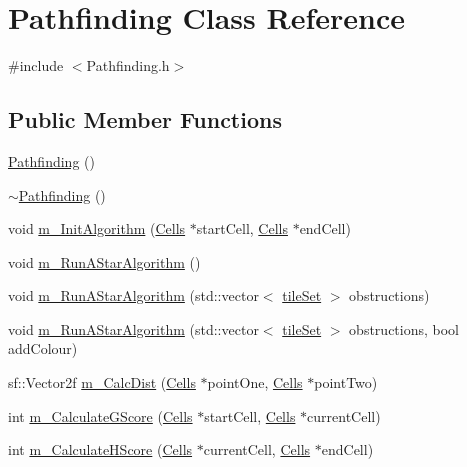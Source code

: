\hypertarget{class_pathfinding}{}\section{Pathfinding Class Reference}
\label{class_pathfinding}


{\ttfamily \#include $<$Pathfinding.\+h$>$}

\subsection*{Public Member Functions}
\begin{DoxyCompactItemize}
\item 
\mbox{\hyperlink{class_pathfinding_aae14d204c5f9ee6b184764f874711341}{Pathfinding}} ()
\item 
\mbox{\hyperlink{class_pathfinding_a1869823af12d301105cf1cedbe9a8dc5}{$\sim$\+Pathfinding}} ()
\item 
void \mbox{\hyperlink{class_pathfinding_a4c5a8788f066f2b91ab52958b211f28d}{m\+\_\+\+Init\+Algorithm}} (\mbox{\hyperlink{class_cells}{Cells}} $\ast$start\+Cell, \mbox{\hyperlink{class_cells}{Cells}} $\ast$end\+Cell)
\item 
void \mbox{\hyperlink{class_pathfinding_a423a7763b0990f4143ffcc517ddf2c29}{m\+\_\+\+Run\+A\+Star\+Algorithm}} ()
\item 
void \mbox{\hyperlink{class_pathfinding_a15896b383f998b1fd8e996b11abfa17a}{m\+\_\+\+Run\+A\+Star\+Algorithm}} (std\+::vector$<$ \mbox{\hyperlink{_cells_8h_adc5e4636eae42cdad2a070c6adbd9daf}{tile\+Set}} $>$ obstructions)
\item 
void \mbox{\hyperlink{class_pathfinding_a0dcc4744c8892ca16c6f685f8c534645}{m\+\_\+\+Run\+A\+Star\+Algorithm}} (std\+::vector$<$ \mbox{\hyperlink{_cells_8h_adc5e4636eae42cdad2a070c6adbd9daf}{tile\+Set}} $>$ obstructions, bool add\+Colour)
\item 
sf\+::\+Vector2f \mbox{\hyperlink{class_pathfinding_a17051c2f3466edb6299444e87d6033fc}{m\+\_\+\+Calc\+Dist}} (\mbox{\hyperlink{class_cells}{Cells}} $\ast$point\+One, \mbox{\hyperlink{class_cells}{Cells}} $\ast$point\+Two)
\item 
int \mbox{\hyperlink{class_pathfinding_a717eed7fdd1fe504da934e575dfa1443}{m\+\_\+\+Calculate\+G\+Score}} (\mbox{\hyperlink{class_cells}{Cells}} $\ast$start\+Cell, \mbox{\hyperlink{class_cells}{Cells}} $\ast$current\+Cell)
\item 
int \mbox{\hyperlink{class_pathfinding_ad89518accab0433588c8e8ffa63b0d16}{m\+\_\+\+Calculate\+H\+Score}} (\mbox{\hyperlink{class_cells}{Cells}} $\ast$current\+Cell, \mbox{\hyperlink{class_cells}{Cells}} $\ast$end\+Cell)

\end{DoxyCompactItemize}
